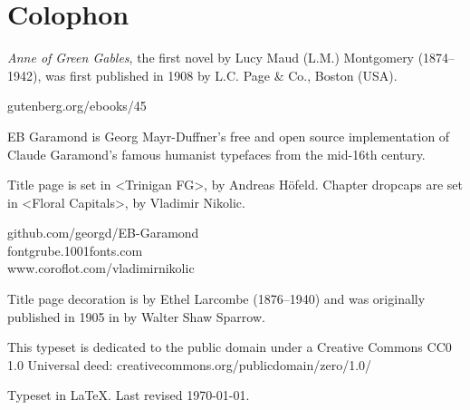 \documentclass[
paper=5.5in:8.5in,
]{scrbook}
\begin{document}
\chapter*{Colophon}
\begin{center}
\begin{minipage}{\textwidth}
\textit{Anne of Green Gables}, the first novel by Lucy Maud (L.M.) Montgomery (1874–1942), was first published in 1908 by L.C. Page \& Co., Boston (USA).
\end{minipage}
\vfill
gutenberg.org/ebooks/45
\vfill
\divider
\vfill
\begin{minipage}{\textwidth}
EB Garamond is Georg Mayr-Duffner's free and open source implementation of Claude Garamond’s famous humanist typefaces from the mid-16th century.

Title page is set in <Trinigan FG>, by Andreas Höfeld. Chapter dropcaps are set in <Floral Capitals>, by Vladimir Nikolic. 
\end{minipage}
\vfill
github.com/georgd/EB-Garamond\\fontgrube.1001fonts.com\\www.coroflot.com/vladimirnikolic
\vfill
\divider
\vfill
\begin{minipage}{\textwidth}
Title page decoration is by Ethel Larcombe (1876--1940) and was originally published in 1905 in  by Walter Shaw Sparrow.
\end{minipage}
\vfill
\divider
\vfill
\begin{minipage}{\textwidth}
This typeset is dedicated to the public domain under a Creative Commons CC0 1.0 Universal deed: creativecommons.org/publicdomain/zero/1.0/
\end{minipage}
\vfill
\divider
\vfill
Typeset in \LaTeX{}. Last revised \today.
\end{center}
\thispagestyle{empty}
\end{document}
